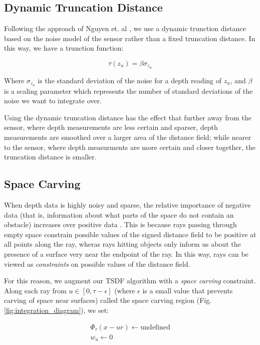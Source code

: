 \subsection{Dynamic Truncation Distance}
Following the approach of Nguyen et. al \cite{Nguyen2012}, we use a dynamic
trunction distance based on the noise model of the sensor rather than a fixed
truncation distance. In this way, we have a trunction function:

\begin{equation} \tau(z_u) = \beta\sigma_{z_u} \end{equation}

Where $\sigma_{z_u}$ is the standard deviation of the noise for a depth reading
of $z_u$, and $\beta$ is a scaling parameter which represents the number of
standard deviations of the noise we want to integrate over.

Using the dynamic truncation distance has the effect that further away from the
sensor, where depth measurements are less certain and sparser, depth
measurements are smoothed over a larger area of the distance field; while nearer
to the sensor, where depth measurments are more certain and closer together, the
truncation distance is smaller.

\subsection{Space Carving}
\label{section:carving}
When depth data is highly noisy and sparse, the relative importance of negative
data (that is, information about what parts of the space do not contain an
obstacle) increases over positive data \cite{Klingensmith2014}. This is because
rays passing through empty space constrain possible values of the signed
distance field to be positive at all points along the ray, wheras rays hitting
objects only inform us about the presence of a surface very near the endpoint of
the ray. In this way, rays can be viewed as \textit{constraints} on possible
values of the distance field. 

For this reason, we augment our TSDF algorithm with a \textit{space carving}
constraint. Along each ray from $u \in [0, \tau - \epsilon]$ (where $\epsilon$
is a small value that prevents carving of space near surfaces) called the space
carving region (Fig. \ref{fig:integration_diagram}), we set:

\begin{align}
\Phi_{\tau}(x - ur) \gets \text{undefined}
\\
%
w_u \gets 0
\end{align}

